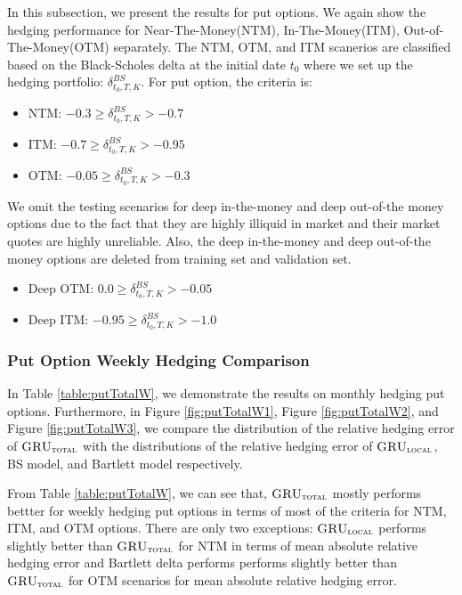 \documentclass[letterpaper,12pt,titlepage,oneside,final]{book}
\numberwithin{equation}{section}
\theoremstyle{definition}
\newcommand{\modelT}{\textsc{GRU}_{\textsc{total}}}
\newcommand{\modelL}{\textsc{GRU}_{\textsc{local}}}
\begin{document}
In this subsection, we present the results for put options. We again show the hedging performance for Near-The-Money(NTM), In-The-Money(ITM), Out-of-The-Money(OTM) separately.  The NTM, OTM, and ITM scanerios are classified based on the Black-Scholes delta at the initial date $t_0$ where we set up the hedging portfolio: $\delta^{BS}_{t_0,T,K}$. For put option, the criteria is:
\begin{itemize}
	\item  NTM: $-0.3 \geq \delta^{BS}_{t_0,T,K} >-0.7$
	\item ITM: $-0.7 \geq \delta^{BS}_{t_0,T,K} >-0.95$
	\item  OTM: $-0.05 \geq \delta^{BS}_{t_0,T,K} >-0.3$
\end{itemize}
We omit the testing scenarios for deep in-the-money and deep out-of-the money options due to the fact that they are highly illiquid in market and their market quotes are highly unreliable. Also, the deep in-the-money and deep out-of-the money options are deleted from training set and validation set.
\begin{itemize}
	\item  Deep OTM: $0.0 \geq \delta^{BS}_{t_0,T,K} >-0.05$
	\item  Deep ITM: $-0.95 \geq \delta^{BS}_{t_0,T,K} >-1.0$
\end{itemize}
\subsubsection{Put Option Weekly Hedging Comparison}
In Table \ref{table:putTotalW}, we demonstrate the results on monthly hedging put options. Furthermore, in Figure \ref{fig:putTotalW1}, Figure \ref{fig:putTotalW2}, and  Figure \ref{fig:putTotalW3}, we compare the distribution of the relative hedging error of $\modelT$ with the distributions of the relative hedging error of $\modelL$, BS model, and Bartlett model respectively.

From Table \ref{table:putTotalW}, we can see that, $\modelT$ mostly performs bettter for weekly hedging put options in terms of most of the criteria for NTM, ITM, and OTM options.  There are only two  exceptions: $\modelL$ performs slightly better than $\modelT$ for NTM  in terms of mean absolute relative hedging error  and Bartlett delta performs performs slightly better than $\modelT$ for OTM scenarios for mean absolute relative hedging error. 
\end{document}

